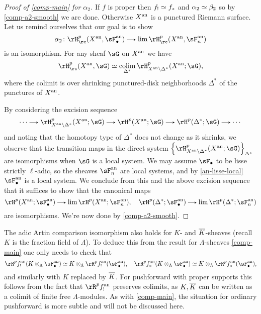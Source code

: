 \begin{nothing}
\begin{proof}[Proof of \cref{comp-main} for $\alpha_2$]
    If $f$ is proper then $f_! \simeq f_*$ and $\alpha_2 \simeq \beta_2$ so by \cref{comp-a2-smooth} we are done. Otherwise $X^{\mathrm{an}}$ is a punctured Riemann surface. Let us remind ourselves that our goal is to show
    \[
      \alpha_2 \c \rH_\rc^p(X^\an, \sF_\bullet^\an) \to \lim \rH_\rc^p(X^\an, \sF_n^\an)
    \]
    is an isomorphism. For any sheaf $\sG$ on $X^{\mathrm{an}}$ we have
    \[
      \rH_\rc^p(X^\an,\sG) \iso \colim_{\Delta^*} \rH_{X^\an \setminus \Delta^*}^p(X^\an; \sG),
    \]
    where the colimit is over shrinking punctured-disk neighborhoods $\Delta^*$ of the punctures of $X^{\mathrm{an}}$.

    By considering the excision sequence
    \[
      \cdots \to \rH_{X^\an \setminus \Delta^*}^p(X^\an; \sG) \to \rH^p(X^\an; \sG) \to \rH^p(\Delta^*; \sG) \to \cdots
    \]
    and noting that the homotopy type of $\Delta^*$ does not change as it shrinks, we observe that the transition maps in the direct system $\l\{\rH_{X^\an \setminus \Delta^*}^p(X^\an; \sG)\r\}_{\Delta^*}$ are isomorphisms when $\sG$ is a local system. We may assume $\sF_\bullet$ to be lisse strictly $\ell$-adic, so the sheaves $\sF_n^\an$ are local systems, and by \cref{an-lisse-local} $\sF_\bullet^\an$ is a local system. We conclude from this and the above excision sequence that it suffices to show that the canonical maps
    \[
      \rH^p(X^\an;\sF_\bullet^\an) \to \lim \rH^p(X^\an;\sF_n^\an), \quad
      \rH^p(\Delta^*;\sF_\bullet^\an) \to \lim \rH^p(\Delta^*;\sF_n^\an)
    \]
    are isomorphisms. We're now done by \cref{comp-a2-smooth}.
  \end{proof}
\end{nothing}

\begin{remark}
  \label{comp-K}
  The adic Artin comparison isomorphism also holds for $K$- and $\overline K$-sheaves (recall $K$ is the fraction field of $\Lambda$). To deduce this from the result for $\Lambda$-sheaves \cref{comp-main} one only needs to check that
  \[
    \rR^pf^\an_!(K \otimes_\Lambda \sF_\bullet^\an) \iso K \otimes_\Lambda \rR^pf^\an_!(\sF_\bullet^\an), \quad
    \rR^pf^\an_*(K \otimes_\Lambda \sF_\bullet^\an) \iso K \otimes_\Lambda \rR^pf^\an_*(\sF_\bullet^\an),
  \]
  and similarly with $K$ replaced by $\overline K$. For pushforward with proper supports this follows from the fact that $\rR^pf^\an_!$ preserves colimits, as $K,\overline K$ can be written as a colimit of finite free $\Lambda$-modules. As with \cref{comp-main}, the situation for ordinary pushforward is more subtle and will not be discussed here.
\end{remark}







